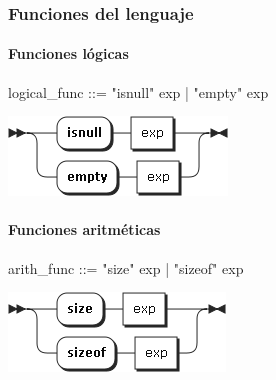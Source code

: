 \subsubsection{Funciones del lenguaje}
\paragraph{Funciones lógicas}
\begin{multicols}{2}
\begin{myverbatim}      
logical_func ::=  "isnull" exp
               |  "empty" exp
\end{myverbatim}  
\columnbreak	
\begin{center}
\includegraphics[scale=0.5]{diagram/logical_func.png} \\
\end{center}
\end{multicols}

\paragraph{Funciones aritméticas}
\begin{multicols}{2}
\begin{myverbatim}      
arith_func ::= "size" exp
            |  "sizeof" exp
\end{myverbatim}  
\columnbreak	
\begin{center}
\includegraphics[scale=0.5]{diagram/arith_func.png} \\
\end{center}
\end{multicols}

